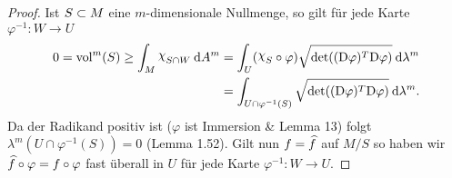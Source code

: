 \documentclass[skript.tex]{subfiles}
\begin{document}
	\begin{proof}
		Ist $S \subset M$ eine $m$-dimensionale Nullmenge, so gilt für jede Karte $\varphi^{-1} \colon W \to U$
		\begin{align*}
			0 = \text{vol}^m(S) \geq \int_M \rchi_{S \cap W} \md A^m &= \int_U (\rchi_S \circ \varphi) \sqrt{\det( (\text{D}\varphi)^T \text{D} \varphi)} \md \lambda^m \\ & = \int_{U \cap \varphi^{-1}(S)} \sqrt{\det( (\text{D}\varphi)^T \text{D} \varphi)} \md \lambda^m.
		\end{align*}
		Da der Radikand positiv ist ($\varphi$ ist Immersion \& Lemma 13) folgt $\lambda^m(U \cap \varphi^{-1}(S)) = 0$ (Lemma 1.52). Gilt nun $f = \widehat{f}$ auf $ M/S$ so haben wir $\widehat{f} \circ \varphi = f \circ \varphi$ fast überall in $U$ für jede Karte $\varphi^{-1} \colon W \to U$.
	\end{proof}
	
	
	
	
\end{document}
